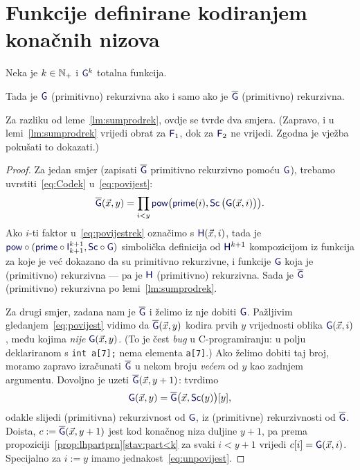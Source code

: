 \section{Funkcije definirane kodiranjem konačnih nizova}

\begin{lema}\label{lm:povijestrek}
Neka je $k\in{\mathbb N}_+$ i $\f{G}^k$ totalna funkcija.

Tada je ${\f G}$ (primitivno) rekurzivna ako i samo ako je $\overline{\f G}$ (primitivno) rekurzivna.
\end{lema}

Za razliku od leme~\ref{lm:sumprodrek}, ovdje se tvrde dva smjera. (Zapravo, i u lemi~\ref{lm:sumprodrek} vrijedi obrat za $\f F_1$, dok za $\f F_2$ ne vrijedi. Zgodna je vježba pokušati to dokazati.)
\begin{proof}
Za jedan smjer (zapisati $\overline{\f G}$ primitivno rekurzivno pomoću $\f G$), trebamo uvrstiti~\eqref{eq:Codek} u~\eqref{eq:povijest}:
\begin{equation}\label{eq:povijestrek}
    \overline{\f G}(\vec x,y)=\prod_{i<y}\f{pow}\bigl(\f{prime}(i),\f{Sc}\,\bigl(\f{G}(\vec x,i)\bigr)\bigr)\text.
\end{equation}
Ako $i$-ti faktor u~\eqref{eq:povijestrek} označimo s $\f H(\vec x,i)$, tada je $\f{pow}\circ(\f{prime}\circ\f I_{k+1}^{k+1},\f{Sc}\circ\f G)$ sim\-bo\-li\-čka definicija od $\f H^{k+1}$ kompozicijom iz funkcija za koje je već dokazano da su primitivno rekurzivne, i funkcije $\f G$ koja je (primitivno) rekurzivna --- pa je $\f H$ (primitivno) rekurzivna. Sada je $\overline{\f G}$ (primitivno) rekurzivna po lemi~\ref{lm:sumprodrek}.

Za drugi smjer, zadana nam je $\overline{\f G}$ i želimo iz nje dobiti $\f G$. Pažljivim gledanjem~\eqref{eq:povijest} vidimo da $\overline{\f G}(\vec x,y)$ kodira prvih $y$ vrijednosti oblika $\f G(\vec x,i)$, među kojima \emph{nije} $\f G(\vec x,y)$. (To je čest \emph{bug} u C-programiranju: u polju deklariranom s \texttt{int a[7];} nema elementa \texttt{a[7]}.) Ako želimo dobiti taj broj, moramo zapravo izračunati $\overline{\f G}$ u nekom broju \emph{većem} od $y$ kao zadnjem argumentu. Dovoljno je uzeti $\overline{\f G}(\vec x,y+1)$: tvrdimo
\begin{equation}\label{eq:unpovijest}
    \f G(\vec x,y)=\overline{\f G}\bigl(\vec x,\f{Sc}(y)\bigr)[y]\text,
\end{equation}
odakle slijedi (primitivna) rekurzivnost od $\f G$, iz (primitivne) rekurzivnosti od $\overline{\f G}$. Doista, $c:=\overline{\f G}(\vec x,y+1)$ jest kod konačnog niza duljine $y+1$, pa prema propoziciji~\ref{prop:lhpartprn}\eqref{stav:part<k} za svaki $i<y+1$ vrijedi $c[i]=\f G(\vec x,i)$. Specijalno za $i:=y$ imamo jednakost~\eqref{eq:unpovijest}.
\end{proof}

